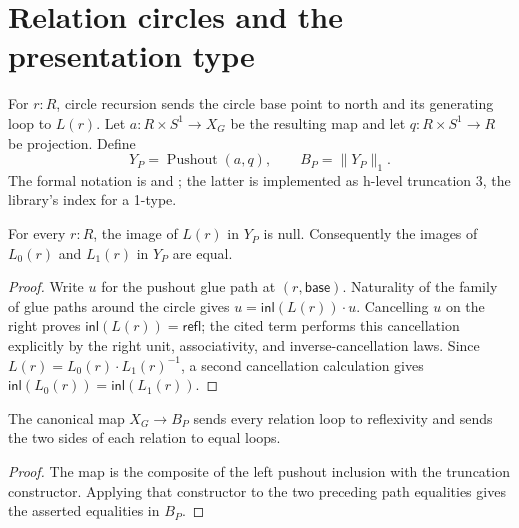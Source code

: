 \section{Relation circles and the presentation type}

\begin{definition}
For $r:R$, circle recursion sends the circle base point to north and its
generating loop to $L(r)$.  Let $a:R\times S^1\to X_G$ be the resulting map
and let $q:R\times S^1\to R$ be projection.  Define
\[
Y_P=\operatorname{Pushout}(a,q), \qquad B_P=\lVert Y_P\rVert_1.
\]
The formal notation is  and ;
the latter is implemented as h-level truncation $3$, the library's index for
a 1-type.
\end{definition}

\begin{proposition}
For every $r:R$, the image of $L(r)$ in $Y_P$ is null.  Consequently the
images of $L_0(r)$ and $L_1(r)$ in $Y_P$ are equal.
\end{proposition}
\begin{proof}
Write $u$ for the pushout glue path at $(r,\mathsf{base})$.  Naturality of
the family of glue paths around the circle gives $u=\mathsf{inl}(L(r))\cdot
u$.  Cancelling $u$ on the right proves $\mathsf{inl}(L(r))=\mathsf{refl}$;
the cited term performs this cancellation explicitly by the right unit,
associativity, and inverse-cancellation laws.  Since $L(r)=L_0(r)\cdot
L_1(r)^{-1}$, a second cancellation calculation gives
$\mathsf{inl}(L_0(r))=\mathsf{inl}(L_1(r))$.
\end{proof}

\begin{corollary}
The canonical map $X_G\to B_P$ sends every relation loop to reflexivity and
sends the two sides of each relation to equal loops.
\end{corollary}
\begin{proof}
The map is the composite of the left pushout inclusion with the truncation
constructor.  Applying that constructor to the two preceding path equalities
gives the asserted equalities in $B_P$.
\end{proof}

